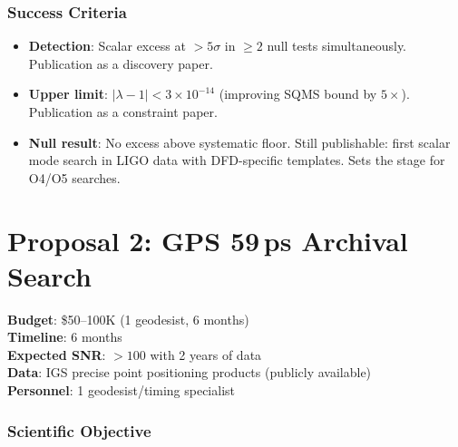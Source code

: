 \documentclass[11pt]{article}
\newcommand{\ee}[1]{\times 10^{#1}}
\newcommand{\lbone}{|\lambda - 1|}
\begin{document}
\section{Success Criteria}

\begin{itemize}
\item \textbf{Detection}: Scalar excess at $>5\sigma$ in $\geq 2$
  null tests simultaneously. Publication as a discovery paper.
\item \textbf{Upper limit}: $\lbone < 3\ee{-14}$ (improving SQMS
  bound by $5\times$). Publication as a constraint paper.
\item \textbf{Null result}: No excess above systematic floor.
  Still publishable: first scalar mode search in LIGO data with
  DFD-specific templates. Sets the stage for O4/O5 searches.
\end{itemize}


\newpage
\part{Proposal 2: GPS 59\,ps Archival Search}
\label{part:gps}

\begin{tcolorbox}[colback=green!3!white, colframe=actioncolor,
  title=\textbf{PROPOSAL 2 --- GPS 59\,PS ARCHIVAL SEARCH}]
\textbf{Budget}: \$50--100K (1 geodesist, 6 months)\\
\textbf{Timeline}: 6 months\\
\textbf{Expected SNR}: $>100$ with 2 years of data\\
\textbf{Data}: IGS precise point positioning products (publicly available)\\
\textbf{Personnel}: 1 geodesist/timing specialist
\end{tcolorbox}

\section{Scientific Objective}
\end{document}
